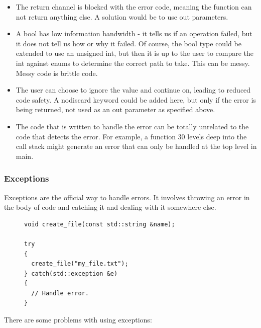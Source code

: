 \documentclass[12pt]{report}
\theoremstyle{definition}
\begin{document}
          \begin{itemize}
            \item The return channel is blocked with the error code, meaning
              the function can not return anything else. A solution would be to
              use out parameters.
            \item A bool has low information bandwidth - it tells us if an
              operation failed, but it does not tell us how or why it failed.
              Of course, the bool type could be extended to use an unsigned int,
              but then it is up to the user to compare the int against enums to
              determine the correct path to take. This can be messy. Messy code
              is brittle code.
            \item The user can choose to ignore the value and continue on,
              leading to reduced code safety. A nodiscard keyword could be
              added here, but only if the error is being returned, not used
              as an out parameter as specified above.
            \item The code that is written to handle the error can be totally
              unrelated to the code that detects the error. For example, a
              function 30 levels deep into the call stack might generate an
              error that can only be handled at the top level in main.
          \end{itemize}

        \subsubsection{Exceptions}

          Exceptions are the official way to handle errors. It involves
          throwing an error in the body of code and catching it and dealing
          with it somewhere else.

          \begin{figure}[h]
            \centering
            \begin{verbatim}
void create_file(const std::string &name);

try
{
  create_file("my_file.txt");
} catch(std::exception &e)
{
  // Handle error.
}
            \end{verbatim}
          \end{figure}

          There are some problems with using exceptions:
\end{document}
